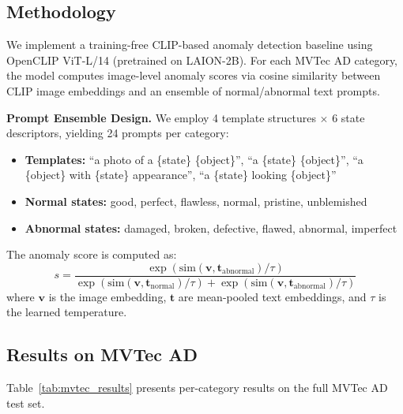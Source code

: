 \subsection{Methodology}

We implement a training-free CLIP-based anomaly detection baseline using OpenCLIP ViT-L/14 (pretrained on LAION-2B). For each MVTec AD category, the model computes image-level anomaly scores via cosine similarity between CLIP image embeddings and an ensemble of normal/abnormal text prompts.

\textbf{Prompt Ensemble Design.} We employ 4 template structures $\times$ 6 state descriptors, yielding 24 prompts per category:

\begin{itemize}[leftmargin=*]
    \item \textbf{Templates:} ``a photo of a \{state\} \{object\}'', ``a \{state\} \{object\}'', ``a \{object\} with \{state\} appearance'', ``a \{state\} looking \{object\}''
    \item \textbf{Normal states:} good, perfect, flawless, normal, pristine, unblemished
    \item \textbf{Abnormal states:} damaged, broken, defective, flawed, abnormal, imperfect
\end{itemize}

The anomaly score is computed as:
\begin{equation}
    s = \frac{\exp(\text{sim}(\mathbf{v}, \mathbf{t}_{\text{abnormal}}) / \tau)}{\exp(\text{sim}(\mathbf{v}, \mathbf{t}_{\text{normal}}) / \tau) + \exp(\text{sim}(\mathbf{v}, \mathbf{t}_{\text{abnormal}}) / \tau)}
\end{equation}
where $\mathbf{v}$ is the image embedding, $\mathbf{t}$ are mean-pooled text embeddings, and $\tau$ is the learned temperature.

\subsection{Results on MVTec AD}

Table~\ref{tab:mvtec_results} presents per-category results on the full MVTec AD test set.

